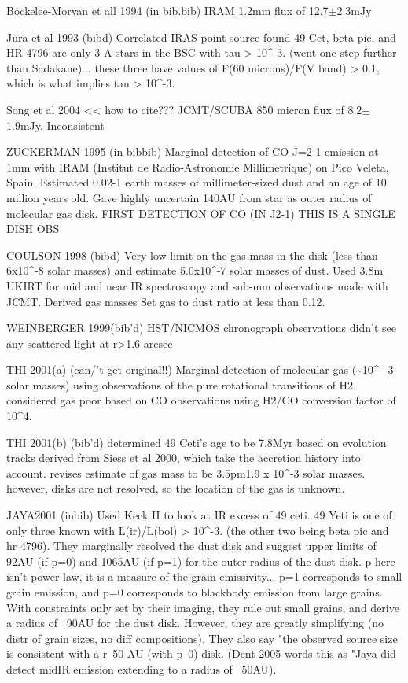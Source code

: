 Bockelee-Morvan et all 1994 (in bib.bib)
IRAM 1.2mm flux of 12.7$\pm$2.3mJy

Jura et al 1993 (bibd)
Correlated IRAS point source found 49 Cet, beta pic, and HR 4796 are only 3 A stars in the BSC with tau > 10^-3. (went one step further than Sadakane)... these three have values of F(60 microns)/F(V band) > 0.1, which is what implies tau > 10^-3. 

Song et al 2004 << how to cite??? 
JCMT/SCUBA 850 micron flux of 8.2$\pm$1.9mJy. 
Inconsistent 

ZUCKERMAN 1995 (in bibbib) 
Marginal detection of CO J=2-1 emission at 1mm with IRAM (Institut de Radio-Astronomie Millimetrique) on Pico Veleta, Spain. Estimated 0.02-1 earth masses of millimeter-sized dust and an age of 10 million years old. Gave highly uncertain 140AU from star as outer radius of molecular gas disk. FIRST DETECTION OF CO (IN J2-1) THIS IS A SINGLE DISH OBS

COULSON 1998 (bibd)
Very low limit on the gas mass in the disk (less than 6x10^-8 solar masses) and estimate 5.0x10^-7 solar masses of dust. Used 3.8m UKIRT for mid and near IR spectroscopy and sub-mm observations made with JCMT. Derived gas masses Set gas to dust ratio at less than 0.12. 

WEINBERGER 1999(bib'd)
HST/NICMOS chronograph observations didn't see any scattered light at r>1.6 arcsec

THI 2001(a) (can/'t get original!!)
Marginal detection of molecular gas (\textasciitilde10^${-3}$ solar masses) using observations of the pure rotational transitions of H2. considered gas poor based on CO observations using H2/CO conversion factor of 10^4. 

THI 2001(b) (bib'd)
determined 49 Ceti's age to be 7.8Myr based on evolution tracks derived from Siess et al 2000, which take the accretion history into account. revises estimate of gas mass to be 3.5pm1.9 x 10^-3 solar masses. however, disks are not resolved, so the location of the gas is unknown. 

JAYA2001 (inbib)
Used Keck II to look at IR excess of 49 ceti. 49 Yeti is one of only three known with L(ir)/L(bol) > 10^-3. (the other two being beta pic and hr 4796). They marginally resolved the dust disk and suggest upper limits of 92AU (if p=0) and 1065AU (if p=1) for the outer radius of the dust disk. p here isn't power law, it is a measure of the grain emissivity... p=1 corresponds to small grain emission, and p=0 corresponds to blackbody emission from large grains. With constraints only set by their imaging, they rule out small grains, and derive a radius of ~90AU for the dust disk. However, they are greatly simplifying (no distr of grain sizes, no diff compositions). They also say "the observed source size is consistent with a r~50 AU (with p~0) disk. (Dent 2005 words this as "Jaya did detect midIR emission extending to a radius of ~50AU). 

